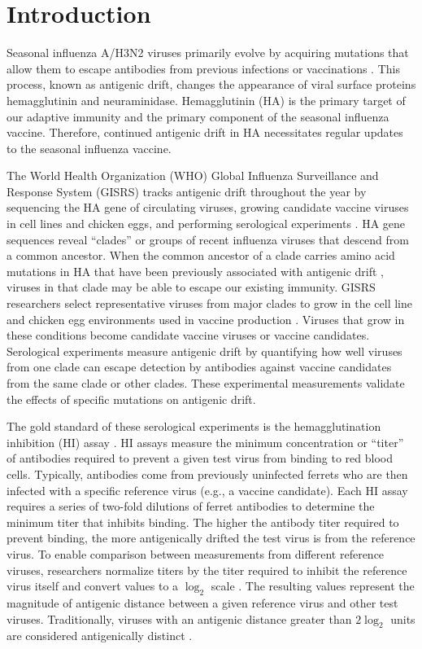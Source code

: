 \documentclass[utf8]{FrontiersinHarvard} %
\begin{document}
\section{Introduction}

Seasonal influenza A/H3N2 viruses primarily evolve by acquiring mutations that allow them to escape antibodies from previous infections or vaccinations \citep{Petrova2018}.
This process, known as antigenic drift, changes the appearance of viral surface proteins hemagglutinin and neuraminidase.
Hemagglutinin (HA) is the primary target of our adaptive immunity and the primary component of the seasonal influenza vaccine.
Therefore, continued antigenic drift in HA necessitates regular updates to the seasonal influenza vaccine.

The World Health Organization (WHO) Global Influenza Surveillance and Response System (GISRS) tracks antigenic drift throughout the year by sequencing the HA gene of circulating viruses, growing candidate vaccine viruses in cell lines and chicken eggs, and performing serological experiments \citep{Morris:2017ea}.
HA gene sequences reveal ``clades'' or groups of recent influenza viruses that descend from a common ancestor.
When the common ancestor of a clade carries amino acid mutations in HA that have been previously associated with antigenic drift \citep{Wolf:2006da,Shih:2007bd,Koel:2013jz}, viruses in that clade may be able to escape our existing immunity.
GISRS researchers select representative viruses from major clades to grow in the cell line and chicken egg environments used in vaccine production \citep{Katz2011}.
Viruses that grow in these conditions become candidate vaccine viruses or vaccine candidates.
Serological experiments measure antigenic drift by quantifying how well viruses from one clade can escape detection by antibodies against vaccine candidates from the same clade or other clades.
These experimental measurements validate the effects of specific mutations on antigenic drift.

The gold standard of these serological experiments is the hemagglutination inhibition (HI) assay \citep{hirst1943studies}.
HI assays measure the minimum concentration or ``titer'' of antibodies required to prevent a given test virus from binding to red blood cells.
Typically, antibodies come from previously uninfected ferrets who are then infected with a specific reference virus (e.g., a vaccine candidate).
Each HI assay requires a series of two-fold dilutions of ferret antibodies to determine the minimum titer that inhibits binding.
The higher the antibody titer required to prevent binding, the more antigenically drifted the test virus is from the reference virus.
To enable comparison between measurements from different reference viruses, researchers normalize titers by the titer required to inhibit the reference virus itself and convert values to a $\log_{2}$ scale \citep{Neher:2016hy}.
The resulting values represent the magnitude of antigenic distance between a given reference virus and other test viruses.
Traditionally, viruses with an antigenic distance greater than $2\log_{2}$ units are considered antigenically distinct \citep{Katz2011}.
\end{document}
